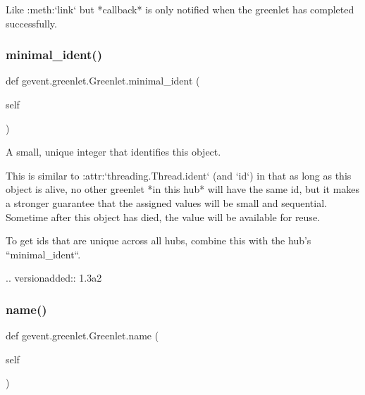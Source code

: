 \begin{DoxyVerb}Like :meth:`link` but *callback* is only notified when the greenlet
has completed successfully.
\end{DoxyVerb}
 \mbox{\label{classgevent_1_1greenlet_1_1_greenlet_aa10558687f387958347de1c50c2df5aa}} 
\subsubsection{\texorpdfstring{minimal\+\_\+ident()}{minimal\_ident()}}
{\footnotesize\ttfamily def gevent.\+greenlet.\+Greenlet.\+minimal\+\_\+ident (\begin{DoxyParamCaption}\item[{}]{self }\end{DoxyParamCaption})}

\begin{DoxyVerb}A small, unique integer that identifies this object.

This is similar to :attr:`threading.Thread.ident` (and `id`)
in that as long as this object is alive, no other greenlet *in
this hub* will have the same id, but it makes a stronger
guarantee that the assigned values will be small and
sequential. Sometime after this object has died, the value
will be available for reuse.

To get ids that are unique across all hubs, combine this with
the hub's ``minimal_ident``.

.. versionadded:: 1.3a2
\end{DoxyVerb}
 \mbox{\label{classgevent_1_1greenlet_1_1_greenlet_ad99614432874dcd22030718c39f83974}} 
\subsubsection{\texorpdfstring{name()}{name()}}
{\footnotesize\ttfamily def gevent.\+greenlet.\+Greenlet.\+name (\begin{DoxyParamCaption}\item[{}]{self }\end{DoxyParamCaption})}

